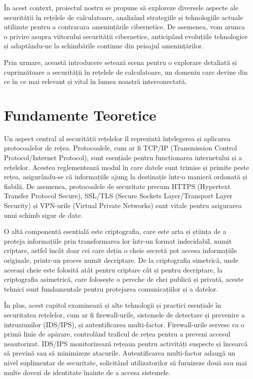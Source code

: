 \documentclass[12pt]{article}
\begin{document}
În acest context, proiectul nostru se propune să exploreze diversele aspecte ale securității în rețelele de calculatoare, analizând strategiile și tehnologiile actuale utilizate pentru a contracara amenințările cibernetice. De asemenea, vom arunca o privire asupra viitorului securității cibernetice, anticipând evoluțiile tehnologice și adaptându-ne la schimbările continue din peisajul amenințărilor.

Prin urmare, această introducere setează scena pentru o explorare detaliată și cuprinzătoare a securității în rețelele de calculatoare, un domeniu care devine din ce în ce mai relevant și vital în lumea noastră interconectată.


\newpage
\section{Fundamente Teoretice}
Un aspect central al securității rețelelor îl reprezintă înțelegerea și aplicarea protocoalelor de rețea. Protocoalele, cum ar fi TCP/IP (Transmission Control Protocol/Internet Protocol), sunt esențiale pentru funcționarea internetului și a rețelelor. Acestea reglementează modul în care datele sunt trimise și primite peste rețea, asigurându-se că informațiile ajung la destinație într-o manieră ordonată și fiabilă. De asemenea, protocoalele de securitate precum HTTPS (Hypertext Transfer Protocol Secure), SSL/TLS (Secure Sockets Layer/Transport Layer Security) și VPN-urile (Virtual Private Networks) sunt vitale pentru asigurarea unui schimb sigur de date.

O altă componentă esențială este criptografia, care este arta și știința de a proteja informațiile prin transformarea lor într-un format indecidabil, numit criptare, astfel încât doar cei care dețin o cheie secretă pot accesa informațiile originale, printr-un proces numit decriptare. De la criptografia simetrică, unde aceeași cheie este folosită atât pentru criptare cât și pentru decriptare, la criptografia asimetrică, care folosește o pereche de chei publică și privată, aceste tehnici sunt fundamentale pentru protejarea comunicațiilor și a datelor.

În plus, acest capitol examinează și alte tehnologii și practici esențiale în securitatea rețelelor, cum ar fi firewall-urile, sistemele de detectare și prevenire a intruziunilor (IDS/IPS), și autentificarea multi-factor. Firewall-urile servesc ca o primă linie de apărare, controlând traficul de rețea pentru a preveni accesul neautorizat. IDS/IPS monitorizează rețeaua pentru activități suspecte și încearcă să prevină sau să minimizeze atacurile. Autentificarea multi-factor adaugă un nivel suplimentar de securitate, solicitând utilizatorilor să furnizeze două sau mai multe dovezi de identitate înainte de a accesa sistemele.
\end{document}
